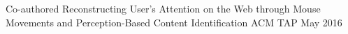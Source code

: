 
\begin{cventries}

	\cventry
		{Co-authored}
		{Reconstructing User's Attention on the Web through Mouse Movements and Perception-Based Content Identification}
		{ACM TAP }
	    {May 2016} %
	    {}
\end{cventries}
